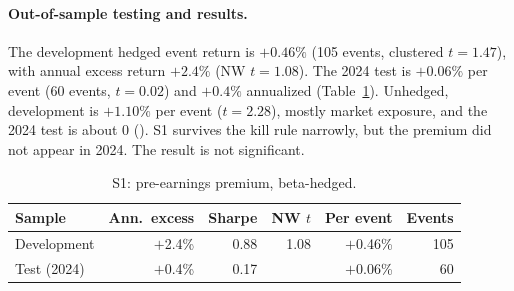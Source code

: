 \documentclass[../main.tex]{subfiles}
\begin{document}
\paragraph{Out-of-sample testing and results.}
The development hedged event return is $+0.46\%$ (105 events, clustered $t = 1.47$), with annual excess return $+2.4\%$ (NW $t = 1.08$). The 2024 test is $+0.06\%$ per event (60 events, $t = 0.02$) and $+0.4\%$ annualized (Table~\ref{tab:s1}). Unhedged, development is $+1.10\%$ per event ($t = 2.28$), mostly market exposure, and the 2024 test is about 0 (). S1 survives the kill rule narrowly, but the premium did not appear in 2024. The result is not significant.

\begin{table}[tbp]
\centering\small
\caption{S1: pre-earnings premium, beta-hedged.}\label{tab:s1}
\begin{tabular}{@{}lrrrrr@{}}
\toprule
Sample & Ann.\ excess & Sharpe & NW $t$ & Per event & Events \\
\midrule
Development & $+$2.4\% & 0.88 & 1.08 & $+$0.46\% & 105 \\
Test (2024) & $+$0.4\% & 0.17 & & $+$0.06\% & 60 \\
\bottomrule
\end{tabular}
\end{table}

\end{document}
